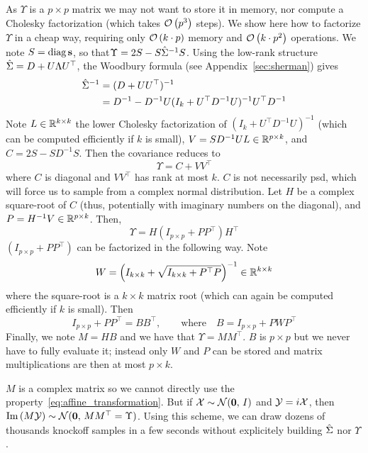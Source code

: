 \bigbreak
As $\Upsilon$ is a $p \times p$ matrix we may not want to store it in memory,
nor compute a Cholesky factorization (which takes $\mathcal{O}\left( p^3 \right)$ steps).
We show here how to factorize $\Upsilon$ in a cheap way,
requiring only $\mathcal{O}\left( k \cdot p \right)$ memory and $\mathcal{O}\left( k\cdot p^2 \right)$ operations.
We note $S = \operatorname*{diag}\mathbf{s}$, so that$\Upsilon = 2S - S\hat{\Sigma}^{-1}S$.
Using the low-rank structure $\hat{\Sigma} = D + U\Lambda U^\top$,
the Woodbury formula (see Appendix~\ref{sec:sherman}) gives
\begin{align*}
    \hat{\Sigma}^{-1} &= (D + UU^\top)^{-1}\\
    &= D^{-1} - D^{-1}U(I_k + U^\top D^{-1}U)^{-1}U^\top D^{-1}
\end{align*}
Note $L \in \mathbb{R}^{k \times k}$ the lower Cholesky factorization of
$(I_k + U^\top D^{-1}U)^{-1}$ (which can be computed efficiently if $k$ is small),
$V = SD^{-1}UL \in \mathbb{R}^{p \times k}$,
and $C = 2S - SD^{-1}S$.
Then the covariance reduces to
\begin{equation*}
    \Upsilon = C + VV^\top
\end{equation*}
where $C$ is diagonal and $VV^\top$ has rank at most $k$.
$C$ is not necessarily psd, which will force us to sample from a complex normal distribution.
Let $H$ be a complex square-root of $C$ (thus, potentially with imaginary numbers on the diagonal),
and $P = H^{-1}V \in \mathbb{R}^{p \times k}$.
Then,
\begin{equation*}
    \Upsilon = H \left( I_{p \times p} + PP^\top \right) H^\top
\end{equation*}
$\left( I_{p \times p} + PP^\top \right)$ can be factorized in the following way.
Note
\begin{equation*}
    W = \left(I_{k \times k} + \sqrt{I_{k \times k} + P^\top P}\right)^{-1} \in \mathbb{R}^{k \times k}
\end{equation*}
where the square-root is a $k \times k$ matrix root (which can again be computed efficiently if $k$ is small).
Then
\begin{equation*}
    I_{p \times p} + PP^\top = BB^\top
    ,\qquad
    \text{where}
    \quad
    B = I_{p \times p} + PWP^\top
\end{equation*}
Finally, we note $M = HB$ and we have that $\Upsilon = MM^\top$.
$B$ is $p \times p$ but we never have to fully evaluate it;
instead only $W$ and $P$ can be stored and matrix multiplications are then at most $p \times k$.

$M$ is a complex matrix so we cannot directly use the property~\ref{eq:affine_transformation}.
But if $\mathcal{X} \sim \mathcal{N}(\mathbf{0},\, I)$ and $\mathcal{Y} = i\mathcal{X}$,
then $\operatorname{Im}\left( M\mathcal{Y} \right) \sim \mathcal{N}(\mathbf{0},\, MM^\top = \Upsilon)$.
Using this scheme, we can draw dozens of thousands knockoff samples in a few seconds without explicitely
building $\hat{\Sigma}$ nor $\Upsilon$.
